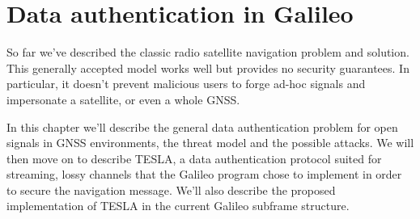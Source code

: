 
\chapter{Data authentication in Galileo}

So far we've described the classic radio satellite navigation problem and
solution. This generally accepted model works well but provides no security
guarantees. In particular, it doesn't prevent malicious users to forge ad-hoc
signals and impersonate a satellite, or even a whole GNSS.

In this chapter we'll describe the general data authentication problem for open
signals in GNSS environments, the threat model and the possible attacks. We will
then move on to describe TESLA, a data authentication protocol suited for
streaming, lossy channels that the Galileo program chose to implement in order
to secure the navigation message. We'll also describe the proposed
implementation of TESLA in the current Galileo subframe structure.


